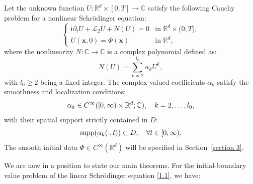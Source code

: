 \documentclass[11pt,reqno,oneside]{amsart}
\numberwithin{equation}{section}
\theoremstyle{definition}
\theoremstyle{remark}
\numberwithin{equation}{section}
\begin{document}
Let the unknown function $U: \mathbb{R}^d 	\times [0,T] \rightarrow \mathbb{C}$ satisfy the following Cauchy problem for a nonlinear Schr\"{o}dinger equation:
\begin{equation}\label{1.2}
    \begin{cases}
        \mathrm{i}\partial_t U + \mathcal{L}_2 U + N(U) = 0 & 	\text{in } \mathbb{R}^{d} 	\times (0,T], \\
        U(\mathbf{x},0) = \Phi(\mathbf{x}) & 	\text{in } \mathbb{R}^d,
    \end{cases}
\end{equation}
where the nonlinearity $N: \mathbb{C} 	\to \mathbb{C}$ is a complex polynomial defined as:
\begin{equation}\label{eq:nonlinearity}
    N(U) = \sum_{k=2}^{l_{0}} \alpha_k U^k,
\end{equation}
with $l_0 \geq 2$ being a fixed integer. The complex-valued coefficients $\alpha_k$ satisfy the smoothness and localization conditions:
\begin{equation}\notag
    \alpha_k \in C^{\infty}([0,\infty) 	\times \mathbb{R}^d; \mathbb{C}), \quad k=2,\dots,l_0,
\end{equation}
with their spatial support strictly contained in $D$:
\begin{equation}\notag
    \operatorname{supp}(\alpha_k(\cdot,t)) \subset D, \quad \forall t \in [0,\infty).
\end{equation}
The smooth initial data $\Phi \in C^{\infty}(\mathbb{R}^d)$ will be specified in Section~\ref{section 3}.





	
We are now in a position to state our main theorems. For the initial-boundary value problem of the linear Schr\"odinger equation \eqref{1.1}, we have:
\end{document}

